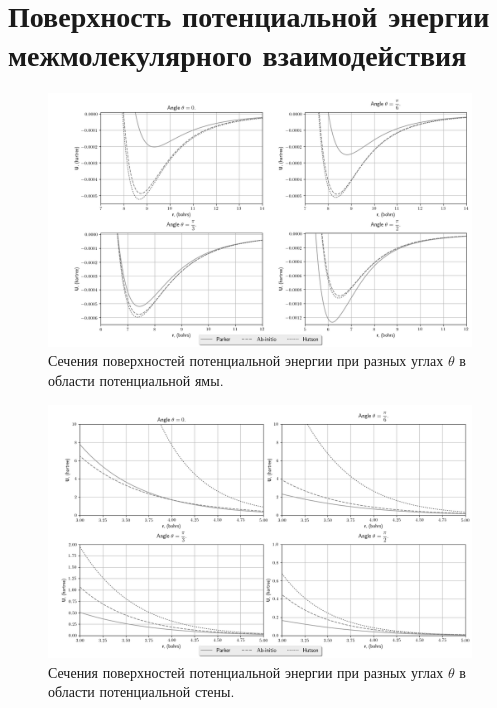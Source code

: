 \section{Поверхность потенциальной энергии межмолекулярного взаимодействия}

\begin{figure}[!h]
	\hspace*{-1.2cm}
	\includegraphics[width=1.1\textwidth]{pictures/potential_well.png}
	\caption{Сечения поверхностей потенциальной энергии при разных углах $\theta$ в области потенциальной ямы.}
\end{figure}

\begin{figure}[!h]
	\hspace*{-1.2cm}
	\includegraphics[width=1.1\textwidth]{pictures/potential_wall.png}
	\caption{Сечения поверхностей потенциальной энергии при разных углах $\theta$ в области потенциальной стены.}
\end{figure}


